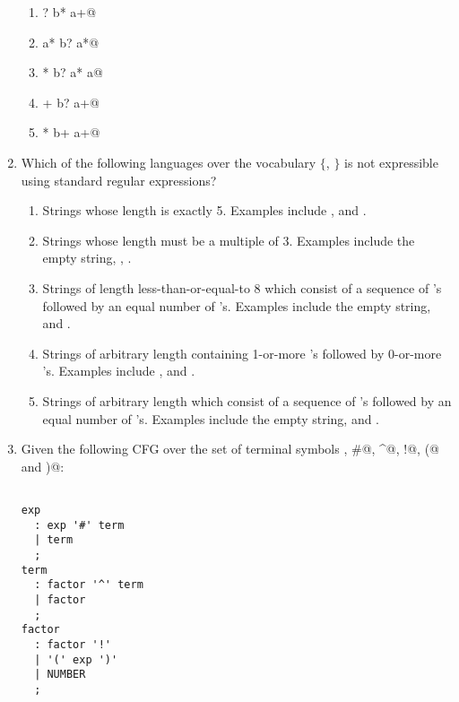 \documentclass[12pt]{article}
\begin{document}
\begin{enumerate}
\begin{enumerate}
\item \verb@a? b* a+@

\item \verb@a a* b? a*@

\item \verb@a* b? a* a@

\item \verb@a+ b? a+@

\item \verb@a* b+ a+@

\end{enumerate}


\item Which of the following languages over the vocabulary $\{$\verb@a@, \verb@b@$\}$ is not expressible using standard regular expressions?

\begin{enumerate}

\item Strings whose length is exactly 5.  Examples include \verb@aabab@,
  \verb@babab@ and \verb@aaaaa@.
  
\item Strings whose length must be a multiple of 3.  Examples include
  the empty string, \verb@aba@, \verb@aabbab@.

\item Strings of length less-than-or-equal-to 8 which consist of
  a sequence of \verb@a@'s followed by an equal number of \verb@b@'s.
  Examples include the empty string, \verb@ab@ and \verb@aaabbb@.

\item Strings of arbitrary length containing 1-or-more \verb@a@'s
  followed by 0-or-more \verb@b@'s.  Examples include \verb@aaa@,
  \verb@a@ and \verb@abbb@.

\item Strings of arbitrary length which consist of
  a sequence of \verb@a@'s followed by an equal number of \verb@b@'s.
  Examples include the empty string, \verb@ab@ and \verb@aaaabbbb@.

\end{enumerate}

\newpage

\item Given the following CFG over the set of terminal symbols 
  \verb@NUMBER@, \verb@#@, \verb@^@, \verb@!@, \verb@(@ and \verb@)@:

\begin{verbatim}

exp
  : exp '#' term
  | term
  ;
term
  : factor '^' term
  | factor
  ;
factor
  : factor '!'
  | '(' exp ')'
  | NUMBER
  ;
\end{verbatim}


\end{enumerate}
\end{document}
